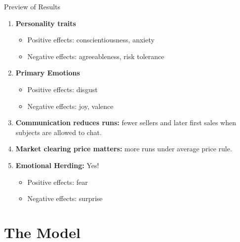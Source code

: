 \documentclass{beamer}
\begin{document}
\begin{frame}{Preview of Results}
\begin{enumerate}

    \item \textbf{Personality traits}
\begin{itemize}
    \item Positive effects: conscientiousness, anxiety 
    \item Negative effects: agreeableness, risk tolerance
\end{itemize}   

    \item \textbf{Primary Emotions}
\begin{itemize}
    \item Positive effects: disgust
    \item Negative effects: joy, valence
\end{itemize}   


    \item \textbf{Communication reduces runs:}  fewer sellers and later first sales when subjects are allowed to chat.

    \item \textbf{Market clearing price matters:} more runs under average price rule. 
        
    \item \textbf{Emotional Herding:} Yes!
    \begin{itemize}
    \item Positive effects: fear
    \item Negative effects: surprise
\end{itemize}   
\end{enumerate}
\end{frame}


\section{The Model}
\end{document}
